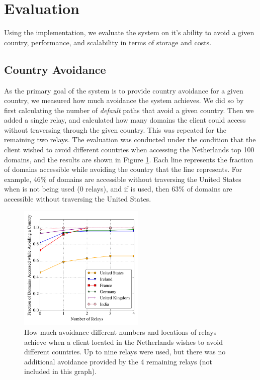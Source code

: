 \section{Evaluation}
Using the \system{} implementation, we evaluate the system on it's ability to avoid a given country, performance, and scalability in terms of storage and costs.

\subsection{Country Avoidance}
As the primary goal of the system is to provide country avoidance for a given 
country, we measured how much avoidance the system achieves.  We did so by first 
calculating the number of {\it default} paths that avoid a given country.  Then 
we added a single relay, and calculated how many domains the client could 
access without traversing through the given country.  This was repeated for 
the remaining two relays.  The evaluation was conducted under the condition that 
the client wished to avoid different countries when accessing the Netherlands top 
100 domains, and the results are shown in Figure \ref{fig:avoidance_eval}.  Each 
line represents the fraction of domains accessible while avoiding the country that 
the line represents.  For example, 46\% of domains are accessible without traversing 
the United States when \system{} is not being used (0 relays), and if \system{} is 
used, then 63\% of domains are accessible without traversing the United States.

\begin{figure}[b!]
\tiny
\centering
\includegraphics[width=.5\textwidth,height=6cm]{avoidance_n_relays}
\caption{How much avoidance different numbers and locations of relays achieve when a 
client located in the Netherlands wishes to avoid different countries.  Up to nine 
relays were used, but there was no additional avoidance provided by the 4 remaining 
relays (not included in this graph).}
\label{fig:avoidance_eval}
\end{figure}


